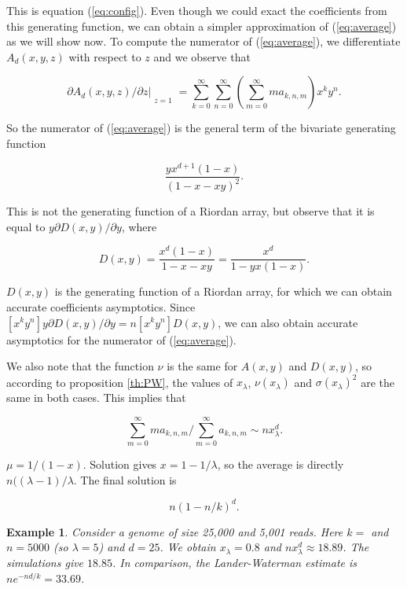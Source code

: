 \documentclass{article}
\newtheorem{example}{Example}
\begin{document}
This is equation (\ref{eq:config}). Even though we could exact the
coefficients from this generating function, we can obtain a simpler
approximation of (\ref{eq:average}) as we will show now.  To compute the
numerator of (\ref{eq:average}), we differentiate $A_d(x,y,z)$ with
respect to $z$ and we observe that

\begin{equation*}
\partial A_d(x,y,z)/\partial z\Bigr|_{\substack{\\z=1}} =
\sum_{k=0}^\infty\sum_{n=0}^\infty
\left(\sum_{m=0}^\infty ma_{k,n,m}\right) x^ky^n.
\end{equation*}

So the numerator of (\ref{eq:average}) is the general term of the
bivariate generating function

\begin{equation*}
\frac{yx^{d+1}(1-x)}{\left(1-x-xy\right)^2}.
\end{equation*}

This is not the generating function of a Riordan array, but observe that
it is equal to $y\partial D(x,y)/\partial y$, where

\begin{equation*}
D(x,y) = \frac{x^d(1-x)}{1-x-xy} =
\frac{x^d}{1-yx(1-x)}.
\end{equation*}

$D(x,y)$ is the generating function of a Riordan array, for which we can
obtain accurate coefficients asymptotics. Since $[x^ky^n]y\partial D(x,y)
/ \partial y = n[x^ky^n]D(x,y)$, we can also obtain accurate
asymptotics for the numerator of (\ref{eq:average}).

We also note that the function $\nu$ is the same for $A(x,y)$ and
$D(x,y)$, so according to proposition \ref{th:PW}, the values of
$x_\lambda$, $\nu(x_\lambda)$ and $\sigma(x_\lambda)^2$ are the same in
both cases. This implies that

\begin{equation*}
\sum_{m=0}^\infty ma_{k,n,m}\Big/\sum_{m=0}^\infty a_{k,n,m} \sim
n x_\lambda^d.
\end{equation*}

$\mu = 1/(1-x)$. Solution gives $x = 1-1/\lambda$, so the average is
directly $n((\lambda-1)/\lambda$. The final solution is

\begin{equation*}
n\left(1-n/k\right)^d.
\end{equation*}

\begin{example}
Consider a genome of size 25,000 and 5,001 reads. Here $k = $ and $n =
5000$ (so $\lambda = 5$) and $d = 25$. We obtain $x_\lambda = 0.8$
and $n x_\lambda^d \approx 18.89$. The simulations give
$18.85$. In comparison, the Lander-Waterman estimate is $ne^{-nd/k} =
33.69$.
\end{example}





\end{document}
